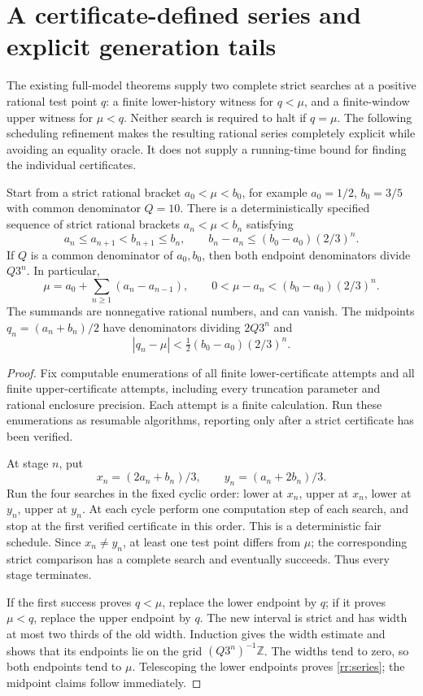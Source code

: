 \section{A certificate-defined series and explicit generation tails}
\label{rr:section}

The existing full-model theorems supply two complete strict searches at
a positive rational test point $q$: a finite lower-history witness for
$q<\mu$, and a finite-window upper witness for $\mu<q$. Neither search
is required to halt if $q=\mu$. The following scheduling refinement
makes the resulting rational series completely explicit while avoiding
an equality oracle. It does not supply a running-time bound for finding
the individual certificates.

\begin{proposition}\label{rr:trisection}
Start from a strict rational bracket $a_0<\mu<b_0$, for example
$a_0=1/2$, $b_0=3/5$ with common denominator $Q=10$. There is a
deterministically specified sequence of strict rational brackets
$a_n<\mu<b_n$ satisfying
\[
 a_n\le a_{n+1}<b_{n+1}\le b_n,
 \qquad b_n-a_n\le(b_0-a_0)(2/3)^n.
\]
If $Q$ is a common denominator of $a_0,b_0$, then both endpoint
denominators divide $Q3^n$. In particular,
\begin{equation}\label{rr:series}
 \mu=a_0+\sum_{n\ge1}(a_n-a_{n-1}),\qquad
 0<\mu-a_n<(b_0-a_0)(2/3)^n.
\end{equation}
The summands are nonnegative rational numbers, and can vanish. The
midpoints $q_n=(a_n+b_n)/2$ have denominators dividing $2Q3^n$ and
\[
 |q_n-\mu|<\tfrac12(b_0-a_0)(2/3)^n.
\]
\end{proposition}

\begin{proof}
Fix computable enumerations of all finite lower-certificate attempts
and all finite upper-certificate attempts, including every truncation
parameter and rational enclosure precision. Each attempt is a finite
calculation. Run these enumerations as resumable algorithms, reporting
only after a strict certificate has been verified.

At stage $n$, put
\[
 x_n=(2a_n+b_n)/3,\qquad y_n=(a_n+2b_n)/3.
\]
Run the four searches in the fixed cyclic order: lower at $x_n$,
upper at $x_n$, lower at $y_n$, upper at $y_n$. At each cycle perform
one computation step of each search, and stop at the first verified
certificate in this order. This is a deterministic fair schedule.
Since $x_n\ne y_n$, at least one test point differs from $\mu$; the
corresponding strict comparison has a complete search and eventually
succeeds. Thus every stage terminates.

If the first success proves $q<\mu$, replace the lower endpoint by
$q$; if it proves $\mu<q$, replace the upper endpoint by $q$. The
new interval is strict and has width at most two thirds of the old
width. Induction gives the width estimate and shows that its endpoints
lie on the grid $(Q3^n)^{-1}\mathbb Z$. The widths tend to zero, so
both endpoints tend to $\mu$. Telescoping the lower endpoints proves
\eqref{rr:series}; the midpoint claims follow immediately.
\end{proof}

